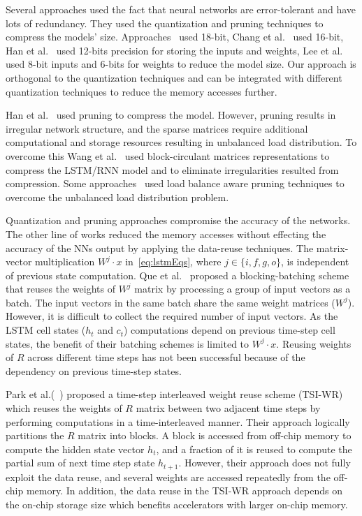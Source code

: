 Several approaches used the fact that neural networks are error-tolerant and have lots of redundancy. They used the quantization and pruning techniques to compress the models' size. Approaches~\cite{ferreira2016fpga,wang2018c} used 18-bit, Chang et al.~\cite{chang2015recurrent} used 16-bit, Han et al.~\cite{han2017ese} used 12-bits precision for storing the inputs and weights, Lee et al.~\cite{lee2016fpga} used 8-bit inputs and 6-bits for weights to reduce the model size. Our approach is orthogonal to the quantization techniques and can be integrated with different quantization techniques to reduce the memory accesses further. 

Han et al.~\cite{han2017ese} used pruning to compress the model. However, pruning results in irregular network structure, and the sparse matrices require additional computational and storage resources resulting in unbalanced load distribution. To overcome this Wang et al.~\cite{wang2018c} used block-circulant matrices representations to compress the LSTM/RNN model and to eliminate irregularities resulted from compression. Some approaches~\cite{park2019balancing,han2017ese,park2018maximizing} used load balance aware pruning techniques to overcome the unbalanced load distribution problem. 

Quantization and pruning approaches compromise the accuracy of the networks. The other line of works reduced the memory accesses without effecting the accuracy of the NNs output by applying the data-reuse techniques. The matrix-vector multiplication $W^j{\cdot}x$ in~\eqref{eq:lstmEqs}, where $j\in \{i,f,g,o\}$, is independent of previous state computation. Que et al.~\cite{que2019efficient} proposed a blocking-batching scheme that reuses the weights of $W^j$ matrix by processing a group of input vectors as a batch. The input vectors in the same batch share the same weight matrices ($W^j$). However, it is difficult to collect the required number of input vectors. As the LSTM cell states ($h_t$ and $c_t$) computations depend on previous time-step cell states, the benefit of their batching schemes is limited to $W^j{\cdot}x$. Reusing weights of $R$ across different time steps has not been successful because of the dependency on previous time-step states.

Park et al.(~\cite{park2020time}) proposed a time-step interleaved weight reuse scheme (TSI-WR) which reuses the weights of $R$ matrix between two adjacent time steps by performing computations in a time-interleaved manner. Their approach logically partitions the $R$ matrix into blocks. A block is accessed from off-chip memory to compute the hidden state vector $h_t$, and a fraction of it is reused to compute the partial sum of next time step state $h_{t+1}$. However, their approach does not fully exploit the data reuse, and several weights are accessed repeatedly from the off-chip memory. In addition, the data reuse in the TSI-WR approach depends on the on-chip storage size which benefits accelerators with larger on-chip memory.

